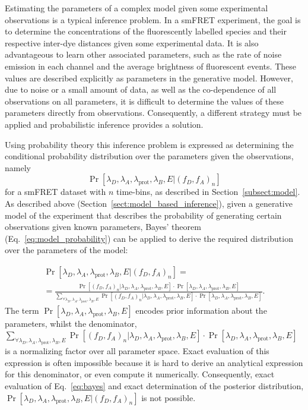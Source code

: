 Estimating the parameters of a complex model given some experimental observations is a typical inference problem. In a smFRET experiment, the goal is to determine the concentrations of the fluorescently labelled species and their respective inter-dye distances given some experimental data. It is also advantageous to learn other associated parameters, such as the rate of noise emission in each channel and the average brightness of fluorescent events. These values are described explicitly as parameters in the generative model. However, due to noise or a small amount of data, as well as the co-dependence of all observations on all parameters, it is difficult to determine the values of these parameters directly from observations. Consequently, a different strategy must be applied and probabilistic inference provides a solution.

Using probability theory this inference problem is expressed as determining the conditional probability distribution over the parameters given the observations, namely $$\Pr[\lambda_D, \lambda_A, \lambda_{\text{prot}}, \lambda_B, E | (f_D, f_A)_n]$$ for a smFRET dataset with $n$ time-bins, as described in Section~\ref{subsect:model}. As described above (Section~\ref{sect:model_based_inference}), given a generative model of the experiment that describes the probability of generating certain observations given known parameters, Bayes' theorem (Eq.~\ref{eq:model_probability}) can be applied to derive the required distribution over the parameters of the model:

\begin{multline}
\Pr[\lambda_D, \lambda_A, \lambda_{\text{prot}}, \lambda_B, E | (f_D, f_A)_n] = \\ = \frac{\Pr[(f_D, f_A)_n |\lambda_D, \lambda_A, \lambda_{\text{prot}}, \lambda_B, E] \cdot \Pr[\lambda_D, \lambda_A, \lambda_{\text{prot}}, \lambda_B, E]}
{\sum_{\forall \lambda_D, \lambda_A, \lambda_{\text{prot}}, \lambda_B, E} \Pr[(f_D, f_A)_n | \lambda_D, \lambda_A, \lambda_{\text{prot}}, \lambda_B, E] \cdot \Pr[\lambda_D, \lambda_A, \lambda_{\text{prot}}, \lambda_B, E]}. 
\label{eq:bayes}
\end{multline}
The term $\Pr[\lambda_D, \lambda_A, \lambda_{\text{prot}}, \lambda_B, E]$ encodes prior information about the parameters, whilst the denominator, $\sum_{\forall \lambda_D, \lambda_A, \lambda_{\text{prot}}, \lambda_B, E} \Pr[(f_D, f_A)_n | \lambda_D, \lambda_A, \lambda_{\text{prot}}, \lambda_B, E] \cdot \Pr[\lambda_D, \lambda_A, \lambda_{\text{prot}}, \lambda_B, E]$ is a normalizing factor over all parameter space. Exact evaluation of this expression is often impossible because it is hard to derive an analytical expression for this denominator, or even compute it numerically. Consequently, exact evaluation of Eq.~\ref{eq:bayes} and exact determination of the posterior distribution, $\Pr[\lambda_D, \lambda_A, \lambda_{\text{prot}}, \lambda_B, E | (f_D, f_A)_n]$ is not possible.

